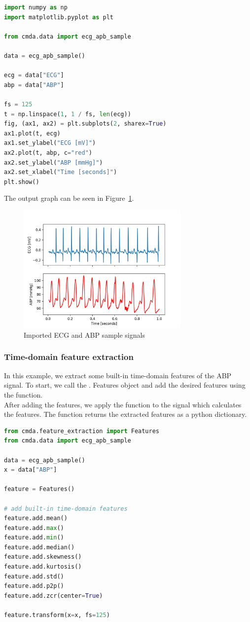 \documentclass{article}
\begin{document}
\begin{lstlisting}[language=Python, caption=Importing a sample data]
import numpy as np
import matplotlib.pyplot as plt

from cmda.data import ecg_apb_sample

data = ecg_apb_sample()

ecg = data["ECG"]
abp = data["ABP"]

fs = 125
t = np.linspace(1, 1 / fs, len(ecg))
fig, (ax1, ax2) = plt.subplots(2, sharex=True)
ax1.plot(t, ecg)
ax1.set_ylabel("ECG [mV]")
ax2.plot(t, abp, c="red")
ax2.set_ylabel("ABP [mmHg]")
ax2.set_xlabel("Time [seconds]")
plt.show()
\end{lstlisting}

The output graph can be seen in Figure~\ref{fig:pipeline}.
\begin{figure}[h]
\includegraphics[width=0.75\textwidth]{ecg_abp_sample.png}
\centering
\caption{Imported ECG and ABP sample signals}
\label{fig:pipeline}
\end{figure}

\subsubsection{Time-domain feature extraction}
In this example, we extract some built-in time-domain features of the ABP signal. To start, we call the . Features object and add the desired features using the  function.\\
After adding the features, we apply the  function to the signal which calculates the features. The  function returns the extracted features as a python dictionary.

\begin{lstlisting}[language=Python, caption=Time-domain feature extraction]
from cmda.feature_extraction import Features
from cmda.data import ecg_apb_sample

data = ecg_apb_sample()
x = data["ABP"]

feature = Features()

# add built-in time-domain features
feature.add.mean()
feature.add.max()
feature.add.min()
feature.add.median()
feature.add.skewness()
feature.add.kurtosis()
feature.add.std()
feature.add.p2p()
feature.add.zcr(center=True)

feature.transform(x=x, fs=125)
\end{lstlisting}
\end{document}
